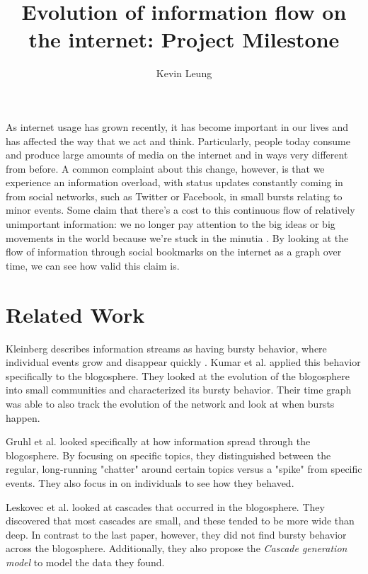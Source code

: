 \documentclass[11pt]{amsart}
\title{Evolution of information flow on the internet: Project Milestone}
\author{Kevin Leung}
\begin{document}
\maketitle
As internet usage has grown recently, it has become important in our lives and has affected the way that we act and think. Particularly, people today consume and produce large amounts of media on the internet and in ways very different from before. A common complaint about this change, however, is that we experience an information overload, with status updates constantly coming in from social networks, such as Twitter or Facebook, in small bursts relating to minor events. Some claim that there's a cost to this continuous flow of relatively unimportant information: we no longer pay attention to the big ideas or big movements in the world because we're stuck in the minutia \cite{big-idea} \cite{egypt}. By looking at the flow of information through social bookmarks on the internet as a graph over time, we can see how valid this claim is.
\section{Related Work}
Kleinberg \cite{bursty-original} describes information streams as having bursty behavior, where individual events grow and disappear quickly . Kumar et al. \cite{bursty} applied this behavior specifically to the blogosphere. They looked at the evolution of the blogosphere into small communities and characterized its bursty behavior. Their time graph was able to also track the evolution of the network and look at when bursts happen. 

Gruhl et al. \cite{gruhl} looked specifically at how information spread through the blogosphere. By focusing on specific topics, they distinguished between the regular, long-running "chatter" around certain topics versus a "spike" from specific events. They also focus in on individuals to see how they behaved.

Leskovec et al. \cite{cascade} looked at cascades that occurred in the blogosphere. They discovered that most cascades are small, and these tended to be more wide than deep. In contrast to the last paper, however, they did not find bursty behavior across the blogosphere. Additionally, they also propose the \textit{Cascade generation model} to model the data they found.
\end{document}
